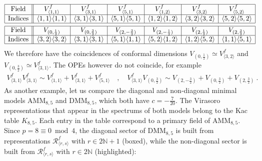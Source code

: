 \documentclass[12pt, a4paper]{article}
\theoremstyle{break}
\begin{document}
\begin{align}
& 
 \begin{array}{|c||c|c|c|c|c|c|}
  \hline 
  \text{Field} & V^f_{\langle 1,1\rangle} & V^f_{\langle 3,1\rangle} & V^f_{\langle 5,1\rangle}
  & V^f_{\langle 1,2\rangle} & V^f_{\langle 3,2\rangle} & V^f_{\langle 5,2\rangle} 
  \\
  \hline
  \text{Indices} & \langle 1,1\rangle\langle 1,1\rangle & \langle 3,1\rangle\langle 3,1\rangle & \langle 5,1\rangle\langle 5,1\rangle & \langle 1,2\rangle\langle 1,2\rangle & \langle 3,2\rangle\langle 3,2\rangle &
  \langle 5,2\rangle\langle 5,2\rangle 
  \\
  \hline 
 \end{array}
 \\
 & 
  \begin{array}{|c||c|c|c|c|c|c|}
  \hline 
  \text{Field} & V_{(0,\frac12)} & V_{(0,\frac32)} & V_{(2,-\frac32)} & V_{(2,-\frac12)} & V_{(2,\frac12)} & V_{(2,\frac32)} 
  \\
  \hline
  \text{Indices} & \langle 3,2\rangle\langle 3,2\rangle & \langle 3,1\rangle\langle 3,1\rangle &  \langle 5,1\rangle\langle 1,1\rangle & \langle 5,2\rangle\langle 1,2\rangle  & \langle 1,2\rangle\langle 5,2\rangle  &  \langle 1,1\rangle\langle 5,1\rangle
  \\
  \hline 
 \end{array}
\end{align}
We therefore have the coincidences of conformal dimensions $V_{(0,\frac12)}\simeq V^f_{\langle 3,2\rangle}$ and $V_{(0,\frac32)}\simeq V^f_{\langle 3,1\rangle}$. The OPEs however do not coincide, for example 
\begin{align}
 V^f_{\langle 3,1\rangle} V^f_{\langle 3,1\rangle} \sim V^f_{\langle 1,1\rangle} + V^f_{\langle 3, 1\rangle} + V^f_{\langle 5,1\rangle} \quad , \quad V^f_{\langle 3,1\rangle}V_{(0,\frac32)} \sim V_{(2,-\frac32)} + V_{(0,\frac32)} + V_{(2,\frac32)}\ . 
\end{align}
As another example, let us compare the diagonal and non-diagonal minimal models AMM$_{8,5}$ and DMM$_{8,5}$, which both have $c=-\frac{7}{20}$. The Virasoro representations that appear in the spectrums of both models belong to the Kac table $K_{8,5}$. Each entry in the table correspond to a primary field of AMM$_{8,5}$. Since $p=8\equiv 0\bmod 4$, the diagonal sector of DMM$_{8,5}$ is built from representations $\mathcal{R}^f_{\langle r,s\rangle}$ with $r\in 2\mathbb{N}+1$ (boxed), while the non-diagonal sector is built from $\mathcal{R}^f_{\langle r,s\rangle}$ with $r\in 2\mathbb{N}$ (highlighted):
\end{document}
